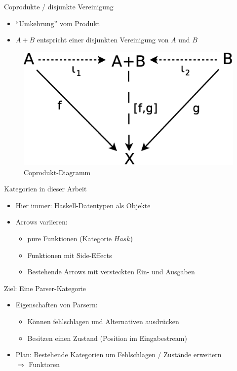 \documentclass{beamer}
\begin{document}
\begin{frame}{Coprodukte / disjunkte Vereinigung}
  \begin{itemize}
  \item "`Umkehrung"' vom Produkt
  \item $A + B$ entspricht einer disjunkten Vereinigung von $A$ und $B$
  \end{itemize}
  \begin{figure}
    \centering
    \includegraphics[scale=0.3]{images/cat_coproduct}
    \caption{Coprodukt-Diagramm}
  \end{figure}
\end{frame}

\begin{frame}{Kategorien in dieser Arbeit}
  \begin{itemize}
  \item Hier immer: Haskell-Datentypen als Objekte
  \item Arrows variieren:
    \begin{itemize}
    \item pure Funktionen (Kategorie $Hask$)
    \item Funktionen mit Side-Effects
    \item Bestehende Arrows mit versteckten Ein- und Ausgaben
    \end{itemize}
  \end{itemize}
\end{frame}

\begin{frame}{Ziel: Eine Parser-Kategorie}
  \begin{itemize}
  \item Eigenschaften von Parsern:
    \begin{itemize}
    \item Können fehlschlagen und Alternativen ausdrücken
    \item Besitzen einen Zustand (Position im Eingabestream)
    \end{itemize}
  \item Plan: Bestehende Kategorien um Fehlschlagen / Zustände erweitern \\
  $\Rightarrow$ Funktoren
  \end{itemize}
\end{frame}
\end{document}
